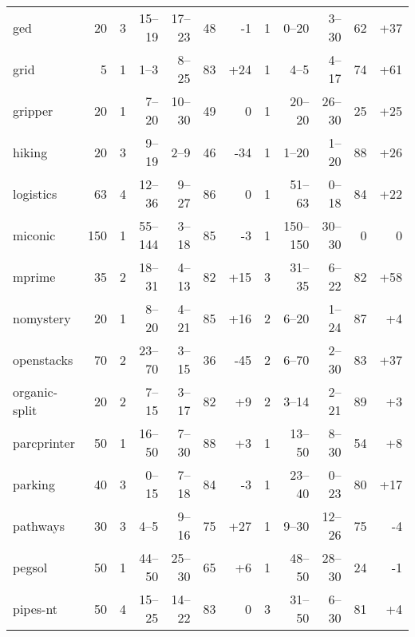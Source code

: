 \documentclass{article}
\begin{document}
\begin{table}
\begin{tabular}{l@{}rr|rrrr|r|rrrr}
           ged &     20 &   3 &   15--19 &  17--23 &  48 &    {\color{red}-1} &   1 &     0--20 &   3--30 &  62 &  {\color{blue}+37} \\
          grid &      5 &   1 &     1--3 &   8--25 &  83 &  {\color{blue}+24} &   1 &      4--5 &   4--17 &  74 &  {\color{blue}+61} \\
       gripper &     20 &   1 &    7--20 &  10--30 &  49 &                  0 &   1 &    20--20 &  26--30 &  25 &  {\color{blue}+25} \\
        hiking &     20 &   3 &    9--19 &    2--9 &  46 &   {\color{red}-34} &   1 &     1--20 &   1--20 &  88 &  {\color{blue}+26} \\
     logistics &     63 &   4 &   12--36 &   9--27 &  86 &                  0 &   1 &    51--63 &   0--18 &  84 &  {\color{blue}+22} \\
       miconic &    150 &   1 &  55--144 &   3--18 &  85 &    {\color{red}-3} &   1 &  150--150 &  30--30 &   0 &                  0 \\
        mprime &     35 &   2 &   18--31 &   4--13 &  82 &  {\color{blue}+15} &   3 &    31--35 &   6--22 &  82 &  {\color{blue}+58} \\
     nomystery &     20 &   1 &    8--20 &   4--21 &  85 &  {\color{blue}+16} &   2 &     6--20 &   1--24 &  87 &   {\color{blue}+4} \\
    openstacks &     70 &   2 &   23--70 &   3--15 &  36 &   {\color{red}-45} &   2 &     6--70 &   2--30 &  83 &  {\color{blue}+37} \\
 organic-split &     20 &   2 &    7--15 &   3--17 &  82 &   {\color{blue}+9} &   2 &     3--14 &   2--21 &  89 &   {\color{blue}+3} \\
   parcprinter &     50 &   1 &   16--50 &   7--30 &  88 &   {\color{blue}+3} &   1 &    13--50 &   8--30 &  54 &   {\color{blue}+8} \\
       parking &     40 &   3 &    0--15 &   7--18 &  84 &    {\color{red}-3} &   1 &    23--40 &   0--23 &  80 &  {\color{blue}+17} \\
      pathways &     30 &   3 &     4--5 &   9--16 &  75 &  {\color{blue}+27} &   1 &     9--30 &  12--26 &  75 &    {\color{red}-4} \\
        pegsol &     50 &   1 &   44--50 &  25--30 &  65 &   {\color{blue}+6} &   1 &    48--50 &  28--30 &  24 &    {\color{red}-1} \\
      pipes-nt &     50 &   4 &   15--25 &  14--22 &  83 &                  0 &   3 &    31--50 &   6--30 &  81 &   {\color{blue}+4} \\

\end{tabular}
\end{table}
\end{document}
